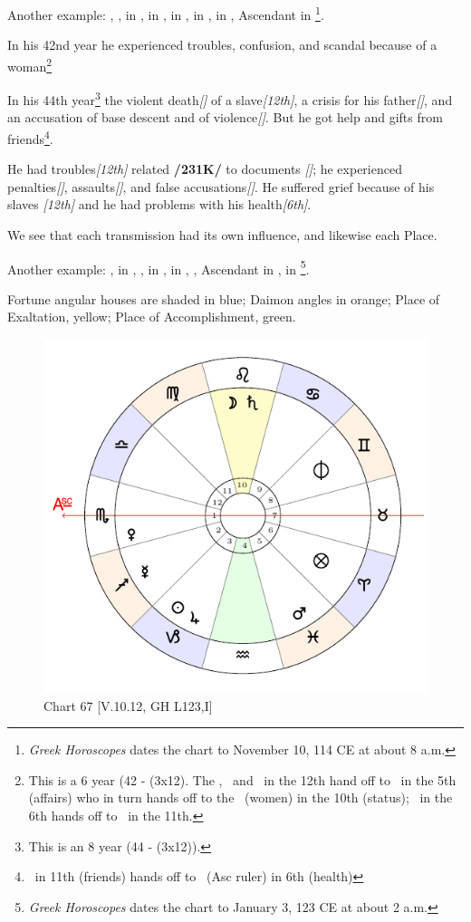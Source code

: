 \noindent Another example: \Sun, \Mars, \Mercury\xspace in \Scorpio, \Saturn\xspace in \Aries, \Moon\xspace in \Virgo, \Jupiter\xspace in \Taurus, \Venus\xspace in \Libra, Ascendant in \Sagittarius\footnote{\textit{Greek Horoscopes} dates the chart to November 10, 114 CE at about 8 a.m.}. 

In his 42nd year he experienced troubles, confusion, and scandal because of a woman\footnote{This is a 6 year (42 - (3x12). The \Sun, \Mars\, and \Mercury\, in the 12th hand off to \Saturn\, in the 5th (affairs) who in turn hands off to the \Moon\, (women) in the 10th (status); \Jupiter\, in the 6th hands off to \Venus\, in the 11th.}

\noindent In his 44th year\footnote{This is an 8 year (44 - (3x12)).} the violent death\textsl{[\Mars]} of a slave\textsl{[12th]}, a crisis for his father\textsl{[\Mars \Conjunction\Sun]}, and an accusation of base descent and of violence\textsl{[\Mars\Conjunction\Mercury]}. But he got help and gifts from friends\footnote{\Venus\, in 11th (friends) hands off to \Jupiter\, (Asc ruler) in 6th (health)}. 

He had troubles\textsl{[12th]} related \textbf{/231K/} to  documents \textsl{[\Mercury]}; he experienced penalties\textsl{[\Jupiter]}, assaults\textsl{[\Mars]}, and false accusations\textsl{[\Mercury]}. He suffered grief because of his slaves \textsl{[12th]} and he had problems with his health\textsl{[6th]}.

\mndl We see that each transmission had its own influence, and likewise each Place.

\newpage
Another example: \Sun, \Jupiter\xspace in \Capricorn, \Moon, \Saturn\xspace in \Leo, \Mars\xspace in \Pisces, \Venus, Ascendant in \Scorpio, \Mercury\xspace in \Sagittarius\footnote{\textit{Greek Horoscopes} dates the chart to January 3, 123 CE at about 2 a.m.}. 

\begin{mdframed}[backgroundcolor=cyan!5]
\tiny
Fortune angular houses are shaded in blue; Daimon angles in orange; Place of Exaltation, yellow; Place of Accomplishment, green.
\end{mdframed}

\begin{figure}
\centering
\vspace{-2em}
\includegraphics[width=.68\textwidth]{charts/5_10_12}
\caption{Chart 67 [V.10.12, GH L123,I]}
\label{fig:chart67}
\end{figure}

